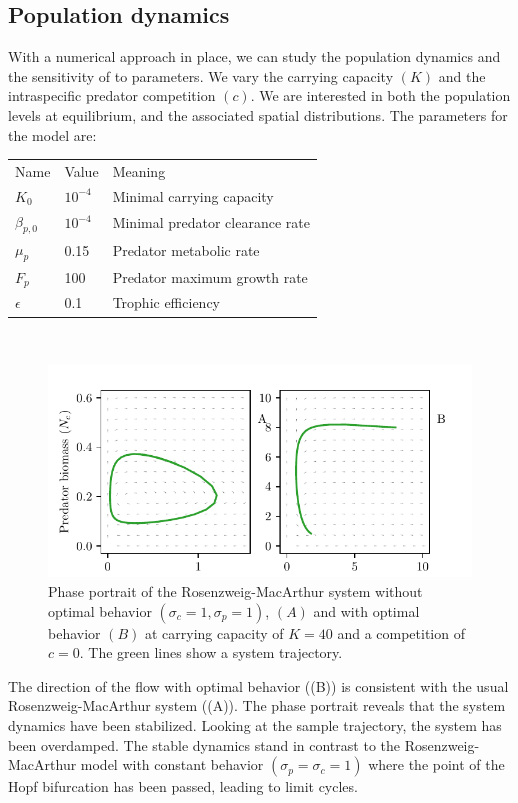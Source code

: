 \subsection{Population dynamics}
With a numerical approach in place, we can study the population dynamics and the sensitivity of  to parameters. We vary the carrying capacity $(K)$ and the intraspecific predator competition $(c)$. We are interested in both  the population levels at equilibrium, and the associated spatial distributions.
The parameters for the model are: \\
\begin{tabular}{l l l}
  Name & Value & Meaning \\
  $K_0$ & $10^{-4}$ & Minimal carrying capacity \\
  $\beta_{p,0}$ & $10^{-4}$ & Minimal predator clearance rate \\
  $\mu_p$ & 0.15 & Predator metabolic rate \\
  $F_p$ & 100 & Predator maximum growth rate \\
  $\epsilon$ & 0.1 & Trophic efficiency
\end{tabular}
\\
\begin{figure}[H]
  \label{fig:pp}
  \caption{Phase portrait of the Rosenzweig-MacArthur system without optimal behavior $(\sigma_c = 1, \sigma_p = 1)$, $(A)$ and with optimal behavior $(B)$ at carrying capacity of $K=40$ and a competition of $c=0$. The green lines show a system trajectory.}
  \label{fig:dynamics}
  \includegraphics{plots/dynamics.pdf}
\end{figure}
The direction of the flow with optimal behavior ((B)) is consistent with the usual Rosenzweig-MacArthur system ((A)). The phase portrait reveals that the system dynamics have been stabilized. Looking at the sample trajectory, the system has been overdamped. The stable dynamics stand in contrast to the Rosenzweig-MacArthur model with constant behavior $(\sigma_p=\sigma_c=1)$ where the point of the Hopf bifurcation has been passed, leading to limit cycles.


